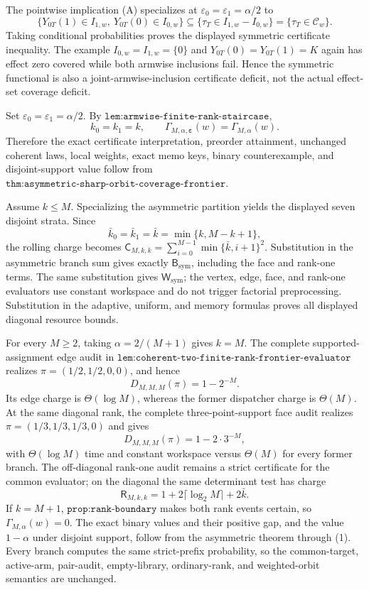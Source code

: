 The pointwise implication (A) specializes at \(\varepsilon_0=\varepsilon_1=\alpha/2\) to
\[
\{Y_{0T}(1)\in I_{1,w},\ Y_{0T}(0)\in I_{0,w}\}
\subseteq\{\tau_T\in I_{1,w}-I_{0,w}\}=\{\tau_T\in\mathcal C_w\}.
\tag{S0}
\]
Taking conditional probabilities proves the displayed symmetric certificate inequality. The example \(I_{0,w}=I_{1,w}=\{0\}\) and \(Y_{0T}(0)=Y_{0T}(1)=K\) again has effect zero covered while both armwise inclusions fail. Hence the symmetric functional is also a joint-armwise-inclusion certificate deficit, not the actual effect-set coverage deficit.

Set \(\varepsilon_0=\varepsilon_1=\alpha/2\). By \(\texttt{lem:armwise-finite-rank-staircase}\),
\[
k_0=k_1=k,\qquad \Gamma_{M,\alpha,\boldsymbol\varepsilon}(w)=\Gamma_{M,\alpha}(w).
\tag{1}
\]
Therefore the exact certificate interpretation, preorder attainment, unchanged coherent laws, local weights, exact memo keys, binary counterexample, and disjoint-support value follow from \(\texttt{thm:asymmetric-sharp-orbit-coverage-frontier}\).

Assume \(k\le M\). Specializing the asymmetric partition yields the displayed seven disjoint strata. Since
\[
\bar k_0=\bar k_1=\bar k=\min\{k,M-k+1\},
\]
the rolling charge becomes \(\mathsf C_{M,k,k}=\sum_{i=0}^{M-1}\min\{\bar k,i+1\}^2\). Substitution in the asymmetric branch sum gives exactly \(\mathsf B_{\mathrm{sym}}\), including the face and rank-one terms. The same substitution gives \(\mathsf W_{\mathrm{sym}}\); the vertex, edge, face, and rank-one evaluators use constant workspace and do not trigger factorial preprocessing. Substitution in the adaptive, uniform, and memory formulas proves all displayed diagonal resource bounds.

For every \(M\ge2\), taking \(\alpha=2/(M+1)\) gives \(k=M\). The complete supported-assignment edge audit in \(\texttt{lem:coherent-two-finite-rank-frontier-evaluator}\) realizes \(\pi=(1/2,1/2,0,0)\), and hence
\[
D_{M,M,M}(\pi)=1-2^{-M}.
\]
Its edge charge is \(\Theta(\log M)\), whereas the former dispatcher charge is \(\Theta(M)\). At the same diagonal rank, the complete three-point-support face audit realizes \(\pi=(1/3,1/3,1/3,0)\) and gives
\[
D_{M,M,M}(\pi)=1-2\cdot3^{-M},
\]
with \(\Theta(\log M)\) time and constant workspace versus \(\Theta(M)\) for every former branch. The off-diagonal rank-one audit remains a strict certificate for the common evaluator; on the diagonal the same determinant test has charge
\[
\mathsf R_{M,k,k}=1+2\lceil\log_2M\rceil+2\bar k.
\]
If \(k=M+1\), \(\texttt{prop:rank-boundary}\) makes both rank events certain, so \(\Gamma_{M,\alpha}(w)=0\). The exact binary values and their positive gap, and the value \(1-\alpha\) under disjoint support, follow from the asymmetric theorem through (1). Every branch computes the same strict-prefix probability, so the common-target, active-arm, pair-audit, empty-library, ordinary-rank, and weighted-orbit semantics are unchanged.